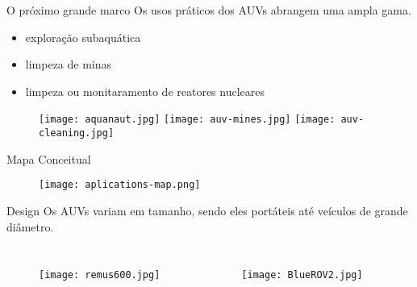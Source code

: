
\begin{frame}[c]{O próximo grande marco}
    Os usos práticos dos AUVs abrangem uma ampla gama.
    \begin{itemize}
        \item exploração subaquática
        \item limpeza de minas
        \item limpeza ou monitaramento de reatores nucleares
    \end{itemize}

    \begin{figure}
        \texttt{[image: aquanaut.jpg]}
        \texttt{[image: auv-mines.jpg]}
        \texttt{[image: auv-cleaning.jpg]}
        \caption{\nocite{WatchMee87:online}}
        \caption{\nocite{Alookbac39:online}}
        \caption{\nocite{MeetAqua67:online}}
    \end{figure}
\end{frame}
\begin{frame}[c]{Mapa Conceitual}
        \begin{figure}
        \texttt{[image: aplications-map.png]}
    \end{figure}
\end{frame}
\begin{frame}[c]{Design}
    Os AUVs variam em tamanho, sendo eles portáteis até veículos de grande diâmetro.
    \newline
    \begin{columns}[t]
        
        \begin{figure}
            \texttt{[image: remus600.jpg]}%
            \caption{\nocite{REMUS6001:online}}
        \end{figure}
        
        \begin{figure}
            \texttt{[image: BlueROV2.jpg]}%
            \caption{\nocite{BlueROV210:online}}
        \end{figure}
        
    \end{columns}
\end{frame}
